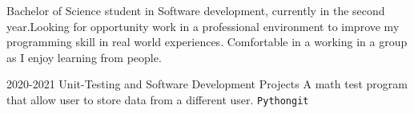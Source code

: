 \documentclass[9pt]{developercv} %
\begin{document}
\vspace{0.5cm}



\begin{minipage}[t]{0.4\textwidth} %
	\vspace{-\baselineskip} %
	Bachelor of Science student in Software development, currently in the second year.Looking for opportunity work in a professional environment to improve my programming skill in real world experiences. Comfortable in a working in a group as I enjoy learning from people. %
\end{minipage}
\hfill %
\begin{minipage}[t]{0.5\textwidth} %
	\vspace{-\baselineskip} %
	\begin{barchart}{5.5}
	\end{barchart}
\end{minipage}

\begin{center}
\end{center}




\begin{entrylist}
	\entry
		{2020-2021}
		{Unit-Testing and Software Development}
		{Projects}
		{A math test program that allow user to store data from a different user.\newline
		\texttt{Python}\slashsep\texttt{git}}

\end{entrylist}

\end{document}
